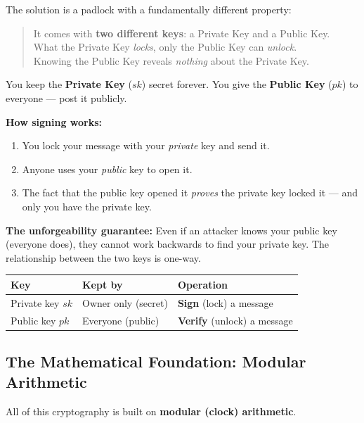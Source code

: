 \documentclass[12pt, a4paper]{article}
\begin{document}
The solution is a padlock with a fundamentally different property:

\begin{quote}
    It comes with \textbf{two different keys}: a Private Key and a Public Key.\\
    What the Private Key \emph{locks}, only the Public Key can \emph{unlock}.\\
    Knowing the Public Key reveals \emph{nothing} about the Private Key.
\end{quote}

You keep the \textbf{Private Key} ($sk$) secret forever. You give the
\textbf{Public Key} ($pk$) to everyone --- post it publicly.

\textbf{How signing works:}
\begin{enumerate}
    \item You lock your message with your \emph{private} key and send it.
    \item Anyone uses your \emph{public} key to open it.
    \item The fact that the public key opened it \emph{proves} the private key
          locked it --- and only you have the private key.
\end{enumerate}

\textbf{The unforgeability guarantee:} Even if an attacker knows your public key
(everyone does), they cannot work backwards to find your private key. The
relationship between the two keys is one-way.

\begin{center}
\begin{tabular}{l l l}
\toprule
\textbf{Key} & \textbf{Kept by} & \textbf{Operation} \\
\midrule
Private key $sk$ & Owner only (secret) & \textbf{Sign} (lock) a message \\
Public key $pk$  & Everyone (public)   & \textbf{Verify} (unlock) a message \\
\bottomrule
\end{tabular}
\end{center}

\subsection{The Mathematical Foundation: Modular Arithmetic}

All of this cryptography is built on \textbf{modular (clock) arithmetic}.
\end{document}
